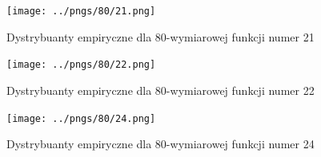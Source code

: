 \documentclass[a4paper,onecolumn,oneside,12pt,wide,floatssmall]{mwrep}
\theoremstyle{definition}
\theoremstyle{plain}%
\theoremstyle{remark}
\begin{document}
\begin{figure}[H]
\centering
\texttt{[image: ../pngs/80/21.png]}
\caption{Dystrybuanty empiryczne dla 80-wymiarowej funkcji numer 21}
\end{figure}

\begin{figure}[H]
\centering
\texttt{[image: ../pngs/80/22.png]}
\caption{Dystrybuanty empiryczne dla 80-wymiarowej funkcji numer 22}
\end{figure}

\begin{figure}[H]
\centering
\texttt{[image: ../pngs/80/24.png]}
\caption{Dystrybuanty empiryczne dla 80-wymiarowej funkcji numer 24}
\end{figure}

\nocite{*}


\end{document}
